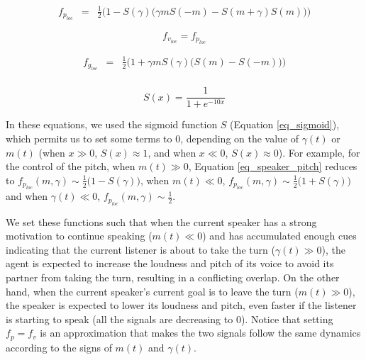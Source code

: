 \documentclass[twocolumn]{svjour3}
\begin{document}
\begin{equation}
\begin{array}{lcl}
f_{p_{loc}} & = &  \frac{1}{2}\Big( 1 - S(\gamma) \big( \gamma m S(-m) - S(m+\gamma)S(m) \big) \Big)
\end{array}
\label{eq_speaker_pitch}
\end{equation}

\begin{equation}
f_{v_{loc}} = f_{p_{loc}}
\label{eq_speaker_volume}
\end{equation}

\begin{equation}
\begin{array}{lcl}
f_{g_{loc}}&=& \frac{1}{2}\Big( 1+\gamma m S(\gamma) \big(S(m) - S(-m)\big) \Big)\\
\end{array}
\label{eq_speaker_gaze}
\end{equation}

\begin{equation}
S(x) = \frac{1}{1+e^{-10x}}
\label{eq_sigmoid}
\end{equation}

In these equations, we used the sigmoid function $S$ (Equation \ref{eq_sigmoid}), which permits us to set some terms to $0$, depending on the value of $\gamma(t)$ or $m(t)$ (when $x \gg 0$, $S(x)\approx 1$, and when $x \ll 0$, $S(x)\approx 0$). 
For example, for the control of the pitch,  when $m(t) \gg 0$, Equation \ref{eq_speaker_pitch} reduces to $f_{p_{loc}}(m,\gamma) \sim \frac{1}{2}\big( 1-S(\gamma) \big)$, 
when $m(t) \ll 0$, $f_{p_{loc}}(m,\gamma) \sim \frac{1}{2}\big( 1 + S(\gamma)\big)$ 
and when $\gamma(t) \ll 0$, $f_{p_{loc}}(m,\gamma) \sim \frac{1}{2}$. 

We set these functions such that when the current speaker has a strong motivation to continue speaking ($m(t) \ll 0$) and has accumulated enough cues indicating that the current listener is about to take the turn  ($\gamma(t) \gg 0$), the agent is expected to increase the loudness and pitch of its voice to avoid its partner from taking the turn, resulting in a conflicting overlap. 
On the other hand, when the current speaker's current goal is to leave the turn ($m(t) \gg 0$), the speaker is expected to lower its loudness and pitch, even faster if the listener is starting to speak (all the signals are decreasing to 0).
Notice that setting $f_p = f_v$ is an approximation that makes the two signals follow the same dynamics according to the signs of $m(t)$ and $\gamma(t)$. 
\end{document}
